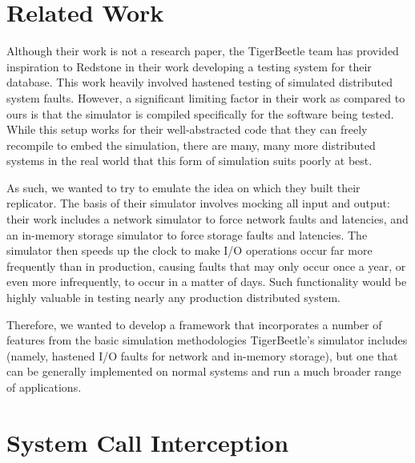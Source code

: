 \section{Related Work}

{\fontsize{12}{15}\selectfont 
Although their work is not a research paper,
the TigerBeetle team has provided inspiration to Redstone in their work developing a testing system for their database.
This work heavily involved hastened testing of simulated distributed system faults.
However, a significant limiting factor in their work as compared to ours is that the simulator is compiled specifically for the software being tested.
While this setup works for their well-abstracted code that they can freely recompile to embed the simulation,
there are many, many more distributed systems in the real world that this form of simulation suits poorly at best.

As such, we wanted to try to emulate the idea on which they built their replicator.
The basis of their simulator involves mocking all input and output:
their work includes a network simulator to force network faults and latencies,
and an in-memory storage simulator to force storage faults and latencies.
The simulator then speeds up the clock to make I/O operations occur far more frequently than in production,
causing faults that may only occur once a year, or even more infrequently, to occur in a matter of days.
Such functionality would be highly valuable in testing nearly any production distributed system.

Therefore,
we wanted to develop a framework that incorporates a number of features from the basic simulation methodologies
TigerBeetle’s simulator includes (namely, hastened I/O faults for network and in-memory storage),
but one that can be generally implemented on normal systems and run a much broader range of applications.

}

\section{System Call Interception}

